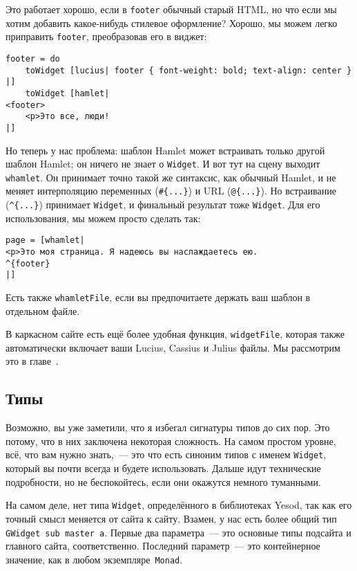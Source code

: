 Это работает хорошо, если в \lstinline'footer' обычный старый HTML, но что если
мы хотим добавить какое-нибудь стилевое оформление? Хорошо, мы можем легко
приправить \lstinline'footer', преобразовав его в виджет:
\begin{lstlisting}
footer = do
    toWidget [lucius| footer { font-weight: bold; text-align: center } |]
    toWidget [hamlet|
<footer>
    <p>Это все, люди!
|]
\end{lstlisting}

Но теперь у нас проблема: шаблон Hamlet может встраивать только другой шаблон
Hamlet; он ничего не знает о \lstinline'Widget'. И вот тут на сцену выходит
\lstinline'whamlet'. Он принимает точно такой же синтаксис, как обычный Hamlet,
и не меняет интерполяцию переменных (\lstinline'#{...}')  и URL
(\lstinline'@{...}'). Но встраивание (\lstinline'^{...}') принимает
\lstinline'Widget', и финальный результат тоже \lstinline'Widget'. Для его
использования, мы можем просто сделать так:
\begin{lstlisting}
page = [whamlet|
<p>Это моя страница. Я надеюсь вы наслаждаетесь ею.
^{footer}
|]
\end{lstlisting}

Есть также \lstinline'whamletFile', если вы предпочитаете держать ваш шаблон в
отдельном файле.

\begin{remark}
    В каркасном сайте есть ещё более удобная функция, \lstinline'widgetFile',
    которая также автоматически включает ваши Lucius, Cassius и Julius файлы.
    Мы рассмотрим это в главе~.
\end{remark}

\subsection{Типы}
Возможно, вы уже заметили, что я избегал сигнатуры типов до сих пор. Это
потому, что в них заключена некоторая сложность. На самом простом уровне, всё,
что вам нужно знать,~--- это что есть синоним типов с именем
\lstinline'Widget', который вы почти всегда и будете использовать. Дальше идут
технические подробности, но не беспокойтесь, если они окажутся немного
туманными.

На самом деле, нет типа \lstinline'Widget', определённого в библиотеках Yesod,
так как его точный смысл меняется от сайта к сайту. Взамен, у нас есть более
общий тип \lstinline'GWidget sub master a'. Первые два параметра~--- это
основные типы подсайта и главного сайта, соответственно. Последний параметр~---
это контейнерное значение, как в любом экземпляре~\lstinline'Monad'.

